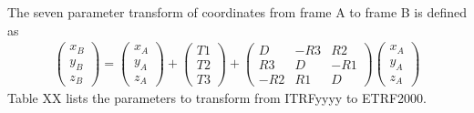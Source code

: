 \documentclass[a4paper,10pt,english]{sphinxmanual}
\begin{document}
The seven parameter transform of coordinates from frame A to frame B is
defined as
\begin{equation*}
\begin{split}\left(\begin{array}{c} x_B \\ y_B \\ z_B\end{array}\right) = 
\left(\begin{array}{c} x_A \\ y_A \\ z_A\end{array}\right) +
\left(\begin{array}{c} T1 \\ T2 \\ T3\end{array}\right) +
\left(\begin{array}{ccc}
    D  & -R3 &  R2 \\
    R3 &  D  & -R1 \\ 
   -R2 &  R1 &  D
\end{array}\right)
\left(\begin{array}{c} x_A \\ y_A \\ z_A\end{array}\right)\end{split}
\end{equation*}
Table XX lists the parameters to transform from ITRFyyyy to ETRF2000.
\end{document}
